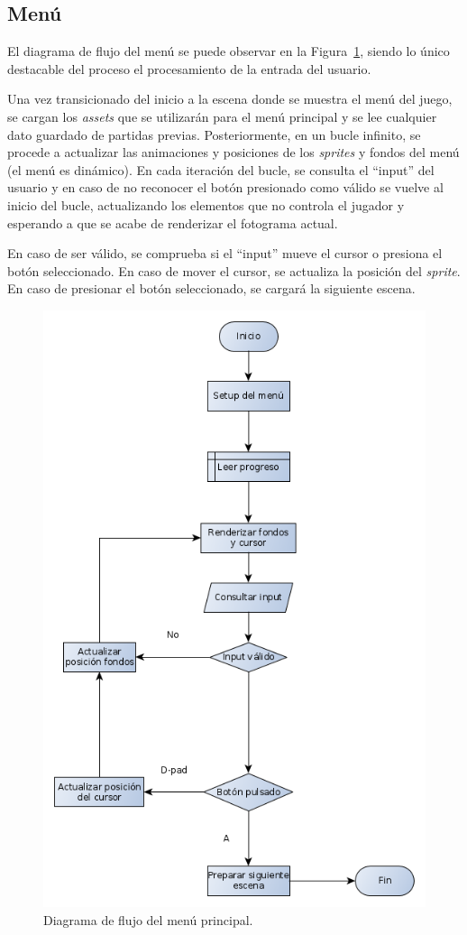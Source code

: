 \subsection{Menú}
El diagrama de flujo del menú se puede observar en la Figura~\ref{fig:flujo_menu}, siendo lo único destacable del proceso el procesamiento de la entrada del usuario.

Una vez transicionado del inicio a la escena donde se muestra el menú del juego, se cargan los \textit{assets} que se utilizarán para el menú principal y se lee cualquier dato guardado de partidas previas. Posteriormente, en un bucle infinito, se procede a actualizar las animaciones y posiciones de los \textit{sprites} y fondos del menú (el menú es dinámico). En cada iteración del bucle, se consulta el ``input'' del usuario y en caso de no reconocer el botón presionado como válido se vuelve al inicio del bucle, actualizando los elementos que no controla el jugador y esperando a que se acabe de renderizar el fotograma actual.

En caso de ser válido, se comprueba si el ``input'' mueve el cursor o presiona el botón seleccionado. En caso de mover el cursor, se actualiza la posición del \textit{sprite}. En caso de presionar el botón seleccionado, se cargará la siguiente escena. 

\begin{figure}[h]
	\centering
	\includegraphics[width=.5\textwidth]{capitulos/diagramas/flujo_menu.png}
	\caption{Diagrama de flujo del menú principal.}\label{fig:flujo_menu}
\end{figure}
\FloatBarrier{}

